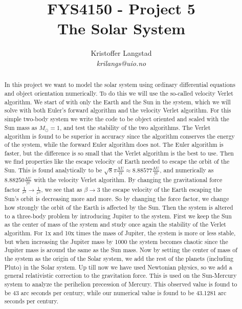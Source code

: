 \documentclass[12pt,a4paper,english]{article}
\title{FYS4150 - Project 5\\
The Solar System}
\date{}
\author{ Kristoffer Langstad\\ \textit{krilangs@uio.no}}
\begin{document}
\maketitle
\begin{abstract}
	In this project we want to model the solar system using ordinary differential equations and object orientation numerically. To do this we will use the so-called velocity Verlet algorithm. We start of with only the Earth and the Sun in the system, which we will solve with both Euler's forward algorithm and the velocity Verlet algorithm. For this simple two-body system we write the code to be object oriented and scaled with the Sun mass as $M_\odot=1$, and test the stability of the two algorithms. The Verlet algorithm is found to be superior in accuracy since the algorithm conserves the energy of the system, while the forward Euler algorithm does not. The Euler algorithm is faster, but the difference is so small that the Verlet algorithm is the best to use. Then we find properties like the escape velocity of Earth needed to escape the orbit of the Sun. This is found analytically to be $\sqrt{8}\pi\frac{\text{AU}}{\text{yr}}\approx8.88577\frac{\text{AU}}{\text{yr}}$, and numerically as $8.88250\frac{\text{AU}}{\text{yr}}$ with the velocity Verlet algorithm. By changing the gravitational force factor $\frac{1}{r^2}\rightarrow\frac{1}{r^{\beta}}$, we see that as $\beta\rightarrow3$ the escape velocity of the Earth escaping the Sun's orbit is decreasing more and more. So by changing the force factor, we change how strongly the orbit of the Earth is affected by the Sun. Then the system is altered to a three-body problem by introducing Jupiter to the system. First we keep the Sun as the center of mass of the system and study once again the stability of the Verlet algorithm. For 1x and 10x times the mass of Jupiter, the system is more or less stable, but when increasing the Jupiter mass by 1000 the system becomes chaotic since the Jupiter mass is around the same as the Sun mass. Now by setting the center of mass of the system as the origin of the Solar system, we add the rest of the planets (including Pluto) in the Solar system. Up till now we have used Newtonian physics, so we add a general relativistic correction to the gravitation force. This is used on the Sun-Mercury system to analyze the perihelion precession of Mercury. This observed value is found to be 43 arc seconds per century, while our numerical value is found to be 43.1281 arc seconds per century.
\end{abstract}
\end{document}
